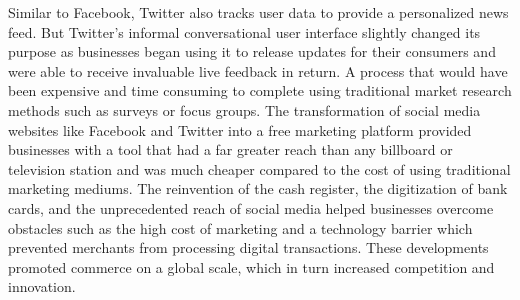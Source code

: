 \documentclass{article}
\begin{document}
Similar to Facebook, Twitter also tracks user data to provide a personalized news feed. But Twitter’s informal conversational user interface slightly changed its purpose as businesses began using it to release updates for their consumers and were able to receive invaluable live feedback in return. A process that would have been expensive and time consuming to complete using traditional market research methods such as surveys or focus groups. The transformation of social media websites like Facebook and Twitter into a free marketing platform provided businesses with a tool that had a far greater reach than any billboard or television station and was much cheaper compared to the cost of using traditional marketing mediums. 
The reinvention of the cash register, the digitization of bank cards, and the unprecedented reach of social media helped businesses overcome obstacles such as the high cost of marketing and a technology barrier which prevented merchants from processing digital transactions. These developments promoted commerce on a global scale, which in turn increased competition and innovation.
\end{document}
